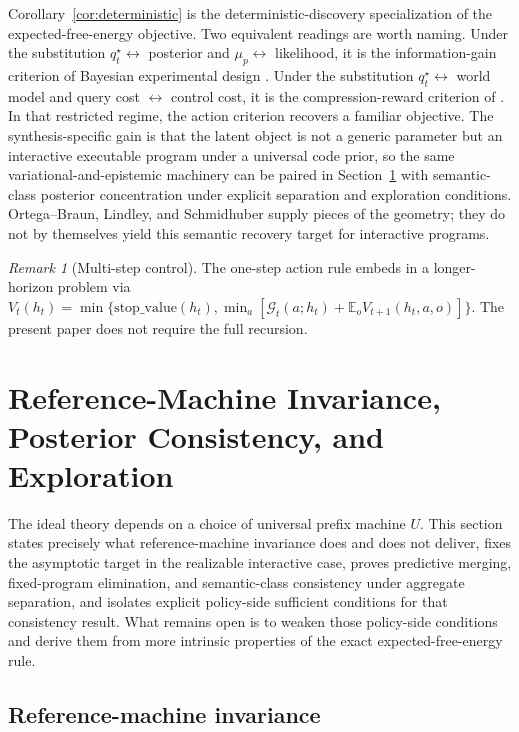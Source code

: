 \documentclass[11pt]{article}
\theoremstyle{remark}
\newtheorem{remark}[definition]{Remark}
\newcommand{\Gcal}{\mathcal{G}}
\newcommand{\E}{\mathbb{E}}
\begin{document}
Corollary~\ref{cor:deterministic} is the deterministic-discovery specialization of the expected-free-energy objective. Two equivalent readings are worth naming. Under the substitution \(q_t^\star \leftrightarrow\) posterior and \(\mu_p \leftrightarrow\) likelihood, it is the information-gain criterion of Bayesian experimental design \citep{Lindley1956,ChalonerVerdinelli1995,MacKay1992}. Under the substitution \(q_t^\star \leftrightarrow\) world model and query cost \(\leftrightarrow\) control cost, it is the compression-reward criterion of \citet{Schmidhuber2010}. In that restricted regime, the action criterion recovers a familiar objective. The synthesis-specific gain is that the latent object is not a generic parameter but an interactive executable program under a universal code prior, so the same variational-and-epistemic machinery can be paired in Section~\ref{sec:invariance} with semantic-class posterior concentration under explicit separation and exploration conditions. Ortega--Braun, Lindley, and Schmidhuber supply pieces of the geometry; they do not by themselves yield this semantic recovery target for interactive programs.

\begin{remark}[Multi-step control]
The one-step action rule embeds in a longer-horizon problem via \(V_t(h_t) = \min\{\mathrm{stop\_value}(h_t), \min_a[\Gcal_t(a;h_t) + \E_{o}V_{t+1}(h_t,a,o)]\}\). The present paper does not require the full recursion.
\end{remark}

\section{Reference-Machine Invariance, Posterior Consistency, and Exploration}
\label{sec:invariance}

The ideal theory depends on a choice of universal prefix machine \(U\). This section states precisely what reference-machine invariance does and does not deliver, fixes the asymptotic target in the realizable interactive case, proves predictive merging, fixed-program elimination, and semantic-class consistency under aggregate separation, and isolates explicit policy-side sufficient conditions for that consistency result. What remains open is to weaken those policy-side conditions and derive them from more intrinsic properties of the exact expected-free-energy rule.

\subsection{Reference-machine invariance}
\end{document}
